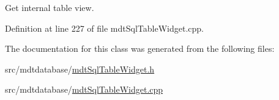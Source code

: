 Get internal table view. 



Definition at line 227 of file mdt\-Sql\-Table\-Widget.\-cpp.



The documentation for this class was generated from the following files\-:\begin{DoxyCompactItemize}
\item 
src/mdtdatabase/\hyperlink{mdt_sql_table_widget_8h}{mdt\-Sql\-Table\-Widget.\-h}\item 
src/mdtdatabase/\hyperlink{mdt_sql_table_widget_8cpp}{mdt\-Sql\-Table\-Widget.\-cpp}\end{DoxyCompactItemize}
